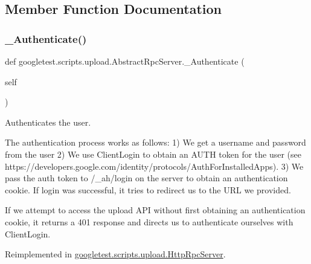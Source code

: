 \subsection{Member Function Documentation}
\mbox{\label{classgoogletest_1_1scripts_1_1upload_1_1_abstract_rpc_server_a6df1e9f6492ff2fb80fa4206d64abbf1}} 
\subsubsection{\texorpdfstring{\_Authenticate()}{\_Authenticate()}}
{\footnotesize\ttfamily def googletest.\+scripts.\+upload.\+Abstract\+Rpc\+Server.\+\_\+\+Authenticate (\begin{DoxyParamCaption}\item[{}]{self }\end{DoxyParamCaption})\hspace{0.3cm}{\ttfamily [private]}}

\begin{DoxyVerb}Authenticates the user.

The authentication process works as follows:
 1) We get a username and password from the user
 2) We use ClientLogin to obtain an AUTH token for the user
(see https://developers.google.com/identity/protocols/AuthForInstalledApps).
 3) We pass the auth token to /_ah/login on the server to obtain an
authentication cookie. If login was successful, it tries to redirect
us to the URL we provided.

If we attempt to access the upload API without first obtaining an
authentication cookie, it returns a 401 response and directs us to
authenticate ourselves with ClientLogin.
\end{DoxyVerb}
 

Reimplemented in \mbox{\hyperlink{classgoogletest_1_1scripts_1_1upload_1_1_http_rpc_server_a6a2403ba3834ce8b4b9e1c14eb897cfb}{googletest.\+scripts.\+upload.\+Http\+Rpc\+Server}}.

\mbox{\label{classgoogletest_1_1scripts_1_1upload_1_1_abstract_rpc_server_afd3f89f57f7db4343ddc8cc65558b120}} 
